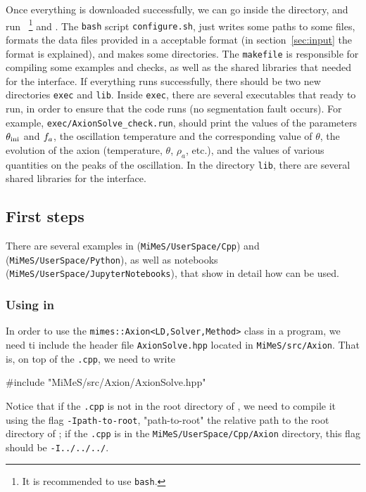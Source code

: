 \documentclass[11pt,a4paper]{article}
\begin{document}
Once everything is downloaded successfully, we can go inside the \mimes directory, and run ~\footnote{It is recommended to use {\tt bash}.} and .  The {\tt bash} script {\tt configure.sh}, just writes some paths to some files, formats the data files provided in a acceptable format (in section~\ref{sec:input} the format is explained), and makes some directories.
%
The {\tt makefile} is responsible for compiling some examples and checks, as well as the shared libraries that needed for the \PY interface.  If everything runs successfully, there should be two new directories {\tt exec} and {\tt lib}. Inside {\tt exec}, there are several executables that ready to run, in order to ensure that the code runs (\eg no segmentation fault occurs). For example, {\tt exec/AxionSolve\_check.run}, should print the values of the parameters $\theta_{\rm ini}{}$ and $f_{a}{}$, the oscillation temperature and the corresponding value of $\theta$, the evolution of the axion (\eg temperature, $\theta$, $\rho_{a}$, etc.), and the values of various quantities on the peaks of the oscillation.  In the directory {\tt lib}, there are several shared libraries for the \PY interface.

\subsection{First steps}\label{sec:first_steps} 
%
There are several examples in \CPP ({\tt MiMeS/UserSpace/Cpp}) and \PY ({\tt MiMeS/UserSpace/Python}), as well as \JUPY  notebooks ({\tt MiMeS/UserSpace/JupyterNotebooks}), that show in detail how \mimes can be used. 

\subsubsection{Using \mimes in \CPP} 
%
In order to use the {\tt mimes::Axion<LD,Solver,Method>} class in a \CPP program, we need ti include the header file {\tt AxionSolve.hpp} located in {\tt MiMeS/src/Axion}. That is, on top of the {\tt .cpp}, we need to write 
%
\begin{cpp}
	#include "MiMeS/src/Axion/AxionSolve.hpp"
\end{cpp}
%
Notice that if the  {\tt .cpp} is not in the root directory of \mimes, we need to compile it using the flag {\tt -Ipath-to-root}, "path-to-root" the relative path to the root directory of \mimes; \eg if the {\tt .cpp} is in the {\tt MiMeS/UserSpace/Cpp/Axion} directory, this flag should be {\tt -I../../../}.
\end{document}
